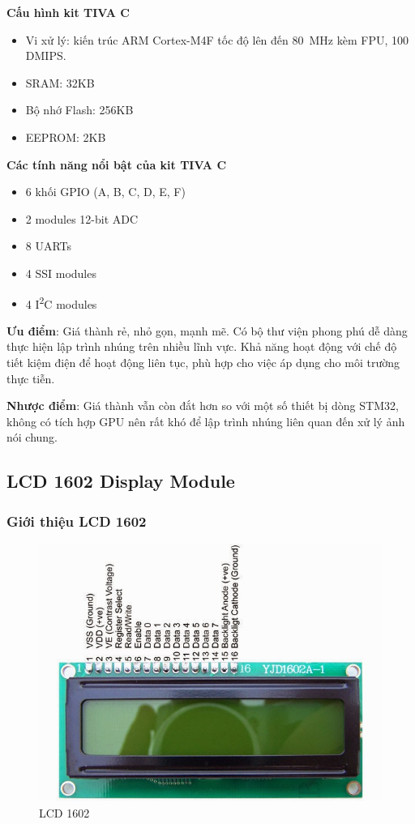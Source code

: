 \textbf{Cấu hình kit TIVA C}
\begin{itemize}
\item Vi xử lý: kiến trúc ARM Cortex-M4F tốc độ lên đến \si{80\MHz} kèm FPU, 100 DMIPS.
\item SRAM: 32KB
\item Bộ nhớ Flash: 256KB
\item EEPROM: 2KB
\end{itemize}

\textbf{Các tính năng nổi bật của kit TIVA C}
\begin{itemize}
\item 6 khối GPIO (A, B, C, D, E, F)
\item 2 modules 12-bit ADC
\item 8 UARTs
\item 4 SSI modules
\item 4 I\textsuperscript{2}C modules
\end{itemize}

\textbf{Ưu điểm}: Giá thành rẻ, nhỏ gọn, mạnh mẽ. Có bộ thư viện phong phú dễ dàng thực hiện lập trình nhúng trên nhiều lĩnh vực.
Khả năng hoạt động với chế độ tiết kiệm điện để hoạt động liên tục, phù hợp cho việc áp dụng cho môi trường thực tiễn.

\textbf{Nhược điểm}: Giá thành vẫn còn đắt hơn so với một số thiết bị dòng STM32, không có tích hợp GPU nên rất khó để lập trình nhúng liên quan đến xử lý ảnh nói chung.

\subsection{LCD 1602 Display Module}
\subsubsection{Giới thiệu LCD 1602}
\begin{figure}[ht]
\centering
\includegraphics[scale=0.45]{images/lcd1602.jpg}
\caption{LCD 1602}
\label{fig:lcd1602}
\end{figure}


